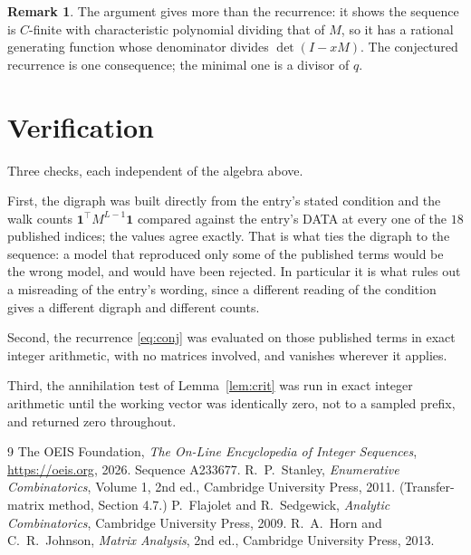 \documentclass[11pt,a4paper]{article}
\theoremstyle{plain}
\theoremstyle{definition}
\newtheorem{remark}[theorem]{Remark}
\begin{document}
\begin{remark}
The argument gives more than the recurrence: it shows the sequence is $C$-finite with
characteristic polynomial dividing that of $M$, so it has a rational generating function
whose denominator divides $\det(I-xM)$. The conjectured recurrence is one consequence; the
minimal one is a divisor of $q$.
\end{remark}

\section{Verification}

Three checks, each independent of the algebra above.

First, the digraph was built directly from the entry's stated condition and the walk counts
$\mathbf{1}^{\!\top}M^{L-1}\mathbf{1}$ compared against the entry's DATA at
every one of the $18$ published indices; the values agree exactly. That is what ties
the digraph to the sequence: a model that reproduced only some of the published terms would
be the wrong model, and would have been rejected. In particular it is what rules out a
misreading of the entry's wording, since a different reading of the condition gives a
different digraph and different counts.

Second, the recurrence \eqref{eq:conj} was evaluated on those published terms in exact
integer arithmetic, with no matrices involved, and vanishes wherever it applies.

Third, the annihilation test of Lemma~\ref{lem:crit} was run in exact integer arithmetic
until the working vector was identically zero, not to a sampled prefix, and returned zero
throughout.

\begin{thebibliography}{9}
 The OEIS Foundation, \emph{The On-Line Encyclopedia of Integer
Sequences}, \url{https://oeis.org}, 2026. Sequence A233677.
 R.~P.~Stanley, \emph{Enumerative Combinatorics}, Volume 1, 2nd ed.,
Cambridge University Press, 2011. (Transfer-matrix method, Section 4.7.)
 P.~Flajolet and R.~Sedgewick, \emph{Analytic Combinatorics}, Cambridge
University Press, 2009.
 R.~A.~Horn and C.~R.~Johnson, \emph{Matrix Analysis}, 2nd ed., Cambridge
University Press, 2013.
\end{thebibliography}
\end{document}
